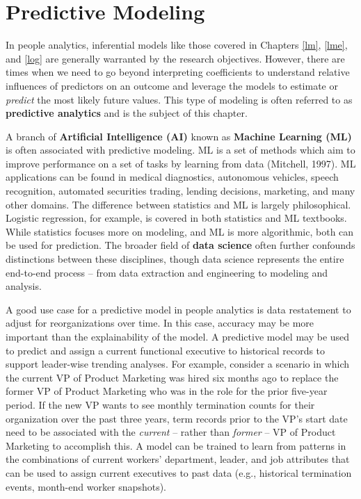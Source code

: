 \documentclass[
]{book}
\begin{document}
\hypertarget{pred-mod}{%
\chapter{Predictive Modeling}\label{pred-mod}}

In people analytics, inferential models like those covered in Chapters \ref{lm}, \ref{lme}, and \ref{log} are generally warranted by the research objectives. However, there are times when we need to go beyond interpreting coefficients to understand relative influences of predictors on an outcome and leverage the models to estimate or \emph{predict} the most likely future values. This type of modeling is often referred to as \textbf{predictive analytics} and is the subject of this chapter.

A branch of \textbf{Artificial Intelligence (AI)} known as \textbf{Machine Learning (ML)} is often associated with predictive modeling. ML is a set of methods which aim to improve performance on a set of tasks by learning from data (Mitchell, 1997). ML applications can be found in medical diagnostics, autonomous vehicles, speech recognition, automated securities trading, lending decisions, marketing, and many other domains. The difference between statistics and ML is largely philosophical. Logistic regression, for example, is covered in both statistics and ML textbooks. While statistics focuses more on modeling, and ML is more algorithmic, both can be used for prediction. The broader field of \textbf{data science} often further confounds distinctions between these disciplines, though data science represents the entire end-to-end process -- from data extraction and engineering to modeling and analysis.

A good use case for a predictive model in people analytics is data restatement to adjust for reorganizations over time. In this case, accuracy may be more important than the explainability of the model. A predictive model may be used to predict and assign a current functional executive to historical records to support leader-wise trending analyses. For example, consider a scenario in which the current VP of Product Marketing was hired six months ago to replace the former VP of Product Marketing who was in the role for the prior five-year period. If the new VP wants to see monthly termination counts for their organization over the past three years, term records prior to the VP's start date need to be associated with the \emph{current} -- rather than \emph{former} -- VP of Product Marketing to accomplish this. A model can be trained to learn from patterns in the combinations of current workers' department, leader, and job attributes that can be used to assign current executives to past data (e.g., historical termination events, month-end worker snapshots).
\end{document}
